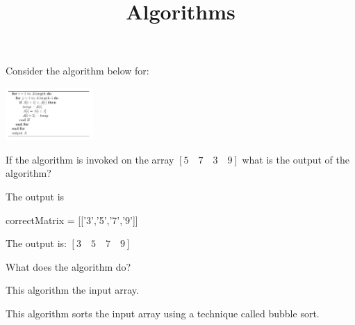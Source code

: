 \documentclass{ximera}
\title{Algorithms}
\begin{document}
\maketitle


Consider the algorithm below for: 

\begin{image}
\includegraphics[width=0.25\textwidth]{algo.png}
\end{image}


\begin{question}
If the algorithm is invoked on the array $[ 5\quad 7\quad 3\quad 9]$ what is the output of the algorithm?
\begin{solution}
The output is 
\begin{matrix-answer}[name=M]
    correctMatrix = [['3','5','7','9']]
\end{matrix-answer}
\end{solution}

The output is:
$ [3 \quad 5 \quad 7 \quad 9] $
\end{question}

\begin{question}
What does the algorithm do? 
\begin{solution}
This algorithm  the input array.
\end{solution}
This algorithm sorts the input array using a technique called bubble sort.
\end{question}
\end{document}

